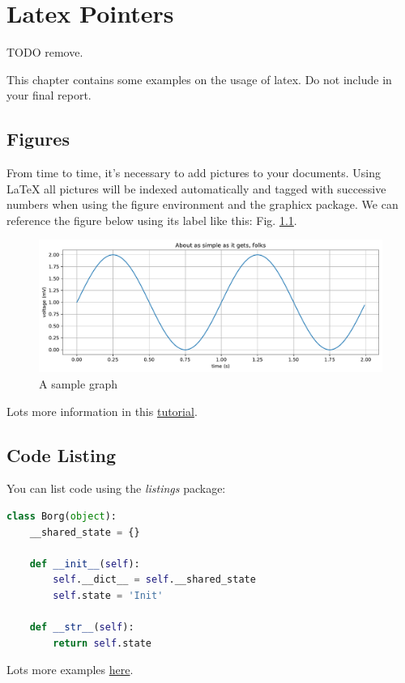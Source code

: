 \chapter{Latex Pointers}

TODO remove.

This chapter contains some examples on the usage of latex. Do not include in your final report.

\section{Figures}
From time to time, it's necessary to add pictures to your documents. Using LaTeX all pictures will be indexed automatically and tagged with successive numbers when using the figure environment and the graphicx package. We can reference the figure below using its label like this: Fig. \ref{fig:test_plot}.
\begin{figure}[H]
  \centering
  \includegraphics[width=0.8\linewidth]{./assets/images/test-plot.pdf}
  \caption{A sample graph}
  \label{fig:test_plot}
\end{figure}

Lots more information in this \href{https://www.latex-tutorial.com/tutorials/figures/}{tutorial}.


\section{Code Listing}
You can list code using the \emph{listings} package:

\begin{lstlisting}[language=Python,caption=Borg Pattern]
class Borg(object):
    __shared_state = {}

    def __init__(self):
        self.__dict__ = self.__shared_state
        self.state = 'Init'

    def __str__(self):
        return self.state
\end{lstlisting}

Lots more examples \href{https://www.overleaf.com/learn/latex/Code_listing}{here}.

